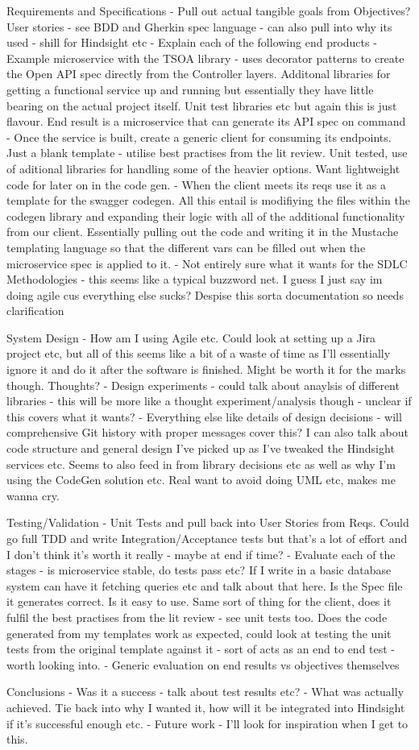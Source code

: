 Requirements and Specifications
	- Pull out actual tangible goals from Objectives? User stories - see BDD and Gherkin spec language - can also pull into why its used - shill for Hindsight etc
	- Explain each of the following end products
		- Example microservice with the TSOA library - uses decorator patterns to create the Open API spec directly from the Controller layers. Additonal libraries for getting a functional service 
		up and running but essentially they have little bearing on the actual project itself. Unit test libraries etc but again this is just flavour. End result is a microservice that can generate
		its API spec on command
		- Once the service is built, create a generic client for consuming its endpoints. Just a blank template - utilise best practises from the lit review. Unit tested, use of aditional libraries
		for handling some of the heavier options. Want lightweight code for later on in the code gen.
		- When the client meets its reqs use it as a template for the swagger codegen. All this entail is modifiying the files within the codegen library and expanding their logic with all of the
		additional functionality from our client. Essentially pulling out the code and writing it in the Mustache templating language so that the different vars can be filled out when the microservice spec
		is applied to it.
	- Not entirely sure what it wants for the SDLC Methodologies - this seems like a typical buzzword net. I guess I just say im doing agile cus everything else sucks? Despise this sorta documentation so needs clarification

System Design
	- How am I using Agile etc. Could look at setting up a Jira project etc, but all of this seems like a bit of a waste of time as I'll essentially ignore it and do it after the software is finished. Might be worth it 
	for the marks though. Thoughts?
	- Design experiments - could talk about anaylsis of different libraries - this will be more like a thought experiment/analysis though - unclear if this covers what it wants?
	- Everything else like details of design decisions - will comprehensive Git history with proper messages cover this? I can also talk about code structure and general design I've picked up as I've tweaked the Hindsight services 
	etc. Seems to also feed in from library decisions etc as well as why I'm using the CodeGen solution etc. Real want to avoid doing UML etc, makes me wanna cry.

Testing/Validation
	- Unit Tests and pull back into User Stories from Reqs. Could go full TDD and write Integration/Acceptance tests but that's a lot of effort and I don't think it's worth it really - maybe at end if time?
	- Evaluate each of the stages - is microservice stable, do tests pass etc? If I write in a basic database system can have it fetching queries etc and talk about that here. Is the Spec file it generates correct.
	Is it easy to use. Same sort of thing for the client, does it fulfil the best practises from the lit review - see unit tests too. Does the code generated from my templates work as expected, could look at testing the unit tests
	from the original template against it - sort of acts as an end to end test - worth looking into. 
	- Generic evaluation on end results vs objectives themselves

Conclusions
	- Was it a success - talk about test results etc?
	- What was actually achieved. Tie back into why I wanted it, how will it be integrated into Hindsight if it's successful enough etc.
	- Future work - I'll look for inspiration when I get to this.
